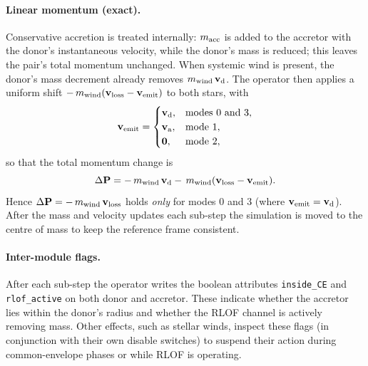\documentclass[11pt]{article}
\begin{document}
\paragraph{Linear momentum (exact).}
Conservative accretion is treated internally: $m_{\rm acc}$ is added to the
accretor with the donor’s instantaneous velocity, while the donor’s mass is
reduced; this leaves the pair’s total momentum unchanged. 
When systemic wind is present, the donor’s mass decrement already removes 
$m_{\rm wind}\,\mathbf v_{\rm d}$. The operator then applies a uniform shift
$-\,m_{\rm wind}(\mathbf v_{\rm loss}-\mathbf v_{\rm emit})$ to both stars, 
with
\[
\mathbf v_{\rm emit} =
\begin{cases}
\mathbf v_{\rm d}, & \text{modes 0 and 3},\\
\mathbf v_{\rm a}, & \text{mode 1},\\
\mathbf 0, & \text{mode 2},
\end{cases}
\]
so that the total momentum change is
\[
\Delta \mathbf P = -\,m_{\rm wind}\,\mathbf v_{\rm d}
-\,m_{\rm wind}(\mathbf v_{\rm loss}-\mathbf v_{\rm emit}).
\]
Hence $\Delta \mathbf P = -\,m_{\rm wind}\,\mathbf v_{\rm loss}$ holds
\emph{only} for modes 0 and 3 (where $\mathbf v_{\rm emit}=\mathbf v_{\rm d}$).
After the mass and velocity updates each sub-step the simulation is moved to
the centre of mass to keep the reference frame consistent.



\paragraph{Inter-module flags.}
After each sub-step the operator writes the boolean attributes
\texttt{inside\_CE} and \texttt{rlof\_active} on both donor and accretor.
These indicate whether the accretor lies within the donor's radius and
whether the RLOF channel is actively removing mass. Other effects, such as
stellar winds, inspect these flags (in conjunction with their own disable
switches) to suspend their action during common-envelope phases or while
RLOF is operating.
\end{document}

